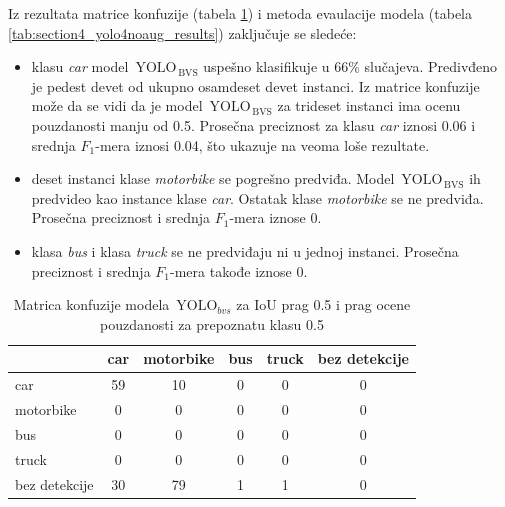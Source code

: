 \documentclass[12pt,oneside]{memoir}
\newcommand{\yolo}{\ensuremath{\,\textrm{YOLO}}}
\newcommand{\bvs}{\ensuremath{\,\textrm{BVS}}}
\begin{document}
Iz rezultata matrice konfuzije (tabela \ref{tab:section4_yolo4noaug_confusionmatrix}) i metoda evaulacije modela (tabela \ref{tab:section4_yolo4noaug_results}) zaključuje se sledeće:
\begin{itemize}
    \item klasu \textit{car} model $\yolo_{\bvs{}}$ uspešno klasifikuje u 66\% slučajeva. Predivđeno je pedest devet od ukupno osamdeset devet instanci. Iz matrice konfuzije može da se vidi da je model $\yolo_{\bvs{}}$ za trideset instanci ima ocenu pouzdanosti manju od 0.5.  Prosečna preciznost za klasu \textit{car} iznosi 0.06 i srednja $F_1$-mera iznosi 0.04, što ukazuje na veoma loše rezultate.
    \item deset instanci klase \textit{motorbike} se pogrešno predviđa. Model $\yolo_{\bvs{}}$ ih  predvideo kao instance klase \textit{car}. Ostatak klase \textit{motorbike} se ne predviđa. Prosečna preciznost i srednja $F_1$-mera iznose 0.
    \item klasa \textit{bus} i klasa \textit{truck} se ne predviđaju ni u jednoj instanci. Prosečna preciznost i srednja $F_1$-mera takođe iznose 0.
\end{itemize}

\begin{table}
    \begin{center}
    \caption{Matrica konfuzije modela $\yolo_{bvs}$ za IoU prag 0.5 i prag ocene pouzdanosti za prepoznatu klasu 0.5 }
    \begin{tabular}{ l|c|c|c|c|c|}
                  & car  & motorbike & bus & truck & bez detekcije \\ \hline
    car           & 59   & 10        & 0   & 0     & 0             \\ 
    motorbike     & 0    & 0         & 0   & 0     & 0             \\ 
    bus           & 0    & 0         & 0   & 0     & 0             \\ 
    truck         & 0    & 0         & 0   & 0     & 0             \\ 
    bez detekcije & 30   & 79        & 1   & 1     & 0             \\ \hline
    \end{tabular}
    \label{tab:section4_yolo4noaug_confusionmatrix}
    \end{center}
\end{table}
\end{document}
